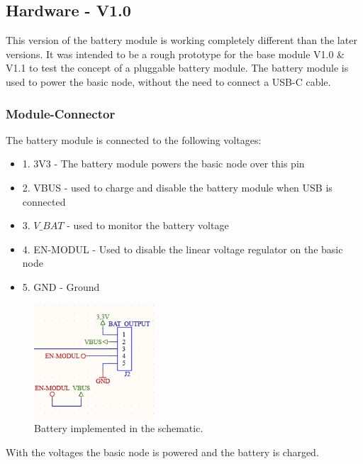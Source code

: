 \subsection{Hardware - V1.0}

This version of the battery module is working completely different than the later versions. 
It was intended to be a rough prototype for the base module V1.0 \& V1.1 to test the 
concept of a pluggable battery module. The battery module is used to power the basic node,
without the need to connect a USB-C cable.

    \subsubsection{Module-Connector}
        The battery module is connected to the following voltages:

        \begin{itemize}
            \item 1. 3V3 - The battery module powers the basic node over this pin
            \item 2. VBUS - used to charge and disable the battery module when USB is connected
            \item 3. $V\_BAT$ - used to monitor the battery voltage
            \item 4. EN-MODUL - Used to disable the linear voltage regulator on the basic node
            \item 5. GND - Ground
        \end{itemize}

        \begin{figure}[H]
            \centering
            \includegraphics[width=0.4\textwidth]{assets/HW/BatteryV1-Connector-schematic.png}
            \caption{Battery implemented in the schematic.}
        \end{figure}
        
        With the voltages the basic node is powered and the battery is charged.

